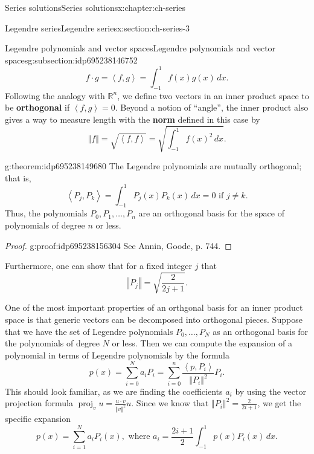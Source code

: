 \documentclass[oneside,10pt,]{book}
\newcommand{\terminology}[1]{\textbf{#1}}
\numberwithin{equation}{section}
\DeclareMathOperator{\proj}{proj}
\newcommand{\R}{\mathbb{R}}
\newcommand{\norm}[1]{\left\Vert#1\right\Vert}
\newcommand{\ip}[2]{\left\langle #1, #2 \right\rangle}
\numberwithin{equation}{section}
\begin{document}
\begin{chapterptx}{Series solutions}{}{Series solutions}{}{}{x:chapter:ch-series}
\begin{sectionptx}{Legendre series}{}{Legendre series}{}{}{x:section:ch-series-3}
\begin{subsectionptx}{Legendre polynomials and vector spaces}{}{Legendre polynomials and vector spaces}{}{}{g:subsection:idp695238146752}
\begin{equation*}
f \cdot g = \ip{f}{g} = \int_{-1}^1 f(x) g(x) \, dx.
\end{equation*}
Following the analogy with \(\R^n\), we define two vectors in an inner product space to be \terminology{orthogonal} if \(\ip{f}{g} = 0\). Beyond a notion of ``angle'', the inner product also gives a way to measure length with the \terminology{norm} defined in this case by%
\begin{equation*}
\norm{f} = \sqrt{\ip{f}{f}} = \sqrt{\int_{-1}^1 f(x)^2 \, dx}.
\end{equation*}
%
\begin{theorem}{}{}{g:theorem:idp695238149680}%
The Legendre polynomials are mutually orthogonal; that is,%
\begin{equation*}
\ip{P_j}{P_k} = \int_{-1}^1 P_j(x) P_k(x) \, dx = 0 \text{ if } j \neq k.
\end{equation*}
Thus, the polynomials \(P_0, P_1, \ldots, P_n\) are an orthogonal basis for the space of polynomials of degree \(n\) or less.%
\end{theorem}
\begin{proof}{}{g:proof:idp695238156304}
See Annin, Goode, p. 744.%
\end{proof}
Furthermore, one can show that for a fixed integer \(j\) that%
\begin{equation*}
\norm{P_j} = \sqrt{\frac{2}{2j+1}}.
\end{equation*}
%
\par
One of the most important properties of an orthgonal basis for an inner product space is that generic vectors can be decomposed into orthogonal pieces. Suppose that we have the set of Legendre polynomials \(P_0, \ldots, P_N\) as an orthogonal basis for the polynomials of degree \(N\) or less. Then we can compute the expansion of a polynomial in terms of Legendre polynomials by the formula%
\begin{equation*}
p(x) = \sum_{i=0}^{N} a_i P_i = \sum_{i=0}^n \frac{\ip{p}{P_i}}{\norm{P_i}^2} P_i.
\end{equation*}
This should look familiar, as we are finding the coefficients \(a_i\) by using the vector projection formula \(\proj_v u = \frac{u\cdot v}{\norm{v}^2} u\). Since we know that \(\norm{P_i}^2 = \frac{2}{2i + 1}\), we get the specific expansion%
\begin{equation*}
p(x) = \sum_{i=1}^N a_i P_i(x), \text{ where } a_i = \frac{2i+1}{2} \int_{-1}^1 p(x) P_i(x) \, dx.
\end{equation*}

\end{subsectionptx}
\end{sectionptx}
\end{chapterptx}
\end{document}
